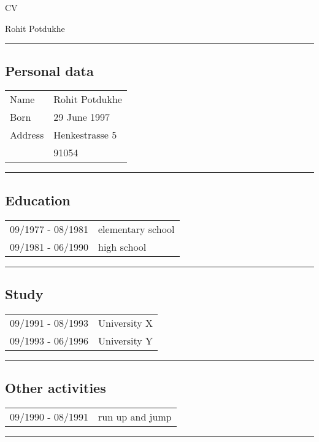 \pagestyle{empty}


\begin{center}
{\sc \LARGE
CV
}

\medskip

\medskip

{\sc \Large
Rohit Potdukhe
}

\end{center}

\bigskip
\rule{\textwidth}{0.1em}




\subsection*{\sc Personal data}
\begin{tabular}{lp{9cm}}
Name & Rohit Potdukhe\\
Born &  29 June 1997\\
Address & Henkestrasse 5 \\
        & 91054
\end{tabular}
\smallskip

\rule{\textwidth}{0.1em}



\subsection*{\sc Education}
\begin{tabular}{lp{9cm}}
09/1977 - 08/1981 &  elementary school\\
09/1981 - 06/1990 & high school\\
\end{tabular}

\smallskip
\rule{\textwidth}{0.1em}

\subsection*{\sc Study}
\begin{tabular}{lp{9cm}}
09/1991 - 08/1993 & University X \\
09/1993 - 06/1996 & University Y
\end{tabular}


\smallskip
\rule{\textwidth}{0.1em}


\subsection*{\sc Other activities}
\begin{tabular}{lp{9cm}}
09/1990 - 08/1991 & run up and jump
\end{tabular}


\smallskip
\rule{\textwidth}{0.1em}



